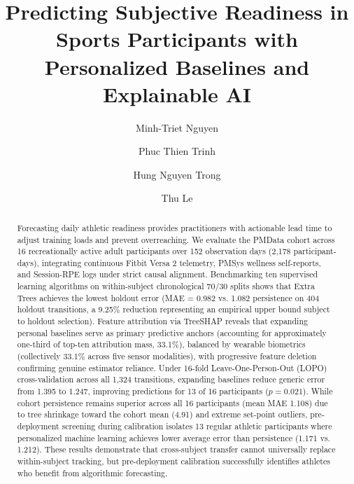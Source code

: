 \documentclass[runningheads]{llncs}
\begin{document}
\raggedbottom

\title{Predicting Subjective Readiness in Sports Participants with Personalized Baselines and Explainable AI}

\author{Minh-Triet Nguyen \and
Phuc Thien Trinh \and
Hung Nguyen Trong \and
Thu Le}



\maketitle

\begin{abstract}
Forecasting daily athletic readiness provides practitioners with actionable lead time to adjust training loads and prevent overreaching. We evaluate the PMData cohort across 16 recreationally active adult participants over 152 observation days (2,178 participant-days), integrating continuous Fitbit Versa 2 telemetry, PMSys wellness self-reports, and Session-RPE logs under strict causal alignment. Benchmarking ten supervised learning algorithms on within-subject chronological 70/30 splits shows that Extra Trees achieves the lowest holdout error (MAE = 0.982 vs. 1.082 persistence on 404 holdout transitions, a 9.25\% reduction representing an empirical upper bound subject to holdout selection). Feature attribution via TreeSHAP reveals that expanding personal baselines serve as primary predictive anchors (accounting for approximately one-third of top-ten attribution mass, 33.1\%), balanced by wearable biometrics (collectively 33.1\% across five sensor modalities), with progressive feature deletion confirming genuine estimator reliance. Under 16-fold Leave-One-Person-Out (LOPO) cross-validation across all 1,324 transitions, expanding baselines reduce generic error from 1.395 to 1.247, improving predictions for 13 of 16 participants ($p = 0.021$). While cohort persistence remains superior across all 16 participants (mean MAE 1.108) due to tree shrinkage toward the cohort mean (4.91) and extreme set-point outliers, pre-deployment screening during calibration isolates 13 regular athletic participants where personalized machine learning achieves lower average error than persistence (1.171 vs. 1.212). These results demonstrate that cross-subject transfer cannot universally replace within-subject tracking, but pre-deployment calibration successfully identifies athletes who benefit from algorithmic forecasting.

\end{abstract}
\end{document}
